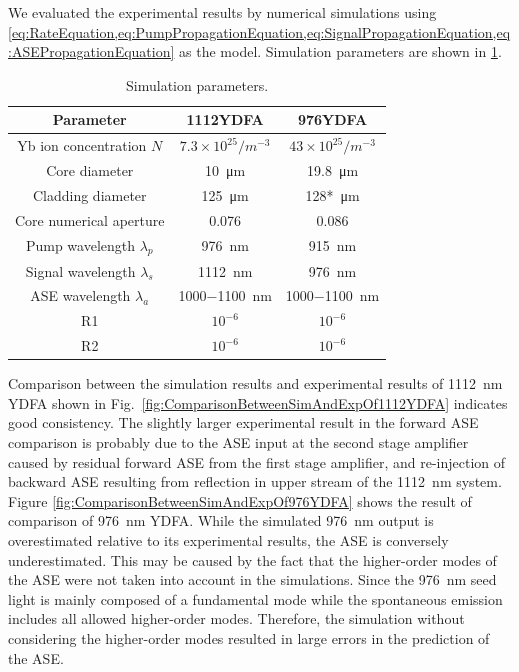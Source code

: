 \documentclass{osa-article}
\begin{document}
We evaluated the experimental results by numerical simulations using \cref{eq:RateEquation,eq:PumpPropagationEquation,eq:SignalPropagationEquation,eq:ASEPropagationEquation} as the model.
Simulation parameters are shown in \cref{tab:SimulationParameters}.
\begin{table}[htbp]
  \caption{Simulation parameters.}
  \label{tab:SimulationParameters}
  \centering
  \begin{tabular}{ccc}
    \hline
    Parameter & 1112YDFA & 976YDFA \\
    \hline \hline
    Yb ion concentration $N$ & $7.3 \times 10^{25}/\si{m^{-3}}$ & $43 \times 10^{25}/\si{m^{-3}}$ \\
    Core diameter & \SI{10}{\um} & \SI{19.8}{\um} \\
    Cladding diameter & \SI{125}{\um} & \SI{128*}{\um} \\
    Core numerical aperture & 0.076 & 0.086 \\
    Pump wavelength $\lambda_{p}$ & \SI{976}{\nm} & \SI{915}{\nm} \\
    Signal wavelength $\lambda_{s}$ & \SI{1112}{\nm} & \SI{976}{\nm} \\
    ASE wavelength $\lambda_{a}$ & \SI{1000-1100}{\nm} & \SI{1000-1100}{\nm} \\
    R1 & $10^{-6}$ & $10^{-6}$ \\
    R2 & $10^{-6}$ & $10^{-6}$ \\
  \end{tabular}
\end{table}
Comparison between the simulation results and experimental results of \SI{1112}{\nm} YDFA shown in Fig.~\ref{fig:ComparisonBetweenSimAndExpOf1112YDFA} indicates good consistency.
The slightly larger experimental result in the forward ASE comparison is probably due to the ASE input at the second stage amplifier caused by residual forward ASE from the first stage amplifier, and re-injection of backward ASE resulting from reflection in upper stream of the \SI{1112}{\nm} system.
Figure \cref{fig:ComparisonBetweenSimAndExpOf976YDFA} shows the result of comparison of \SI{976}{\nm} YDFA.
While the simulated \SI{976}{\nm} output is overestimated relative to its experimental results, the ASE is conversely underestimated.
This may be caused by the fact that the higher-order modes of the ASE were not taken into account in the simulations.
Since the \SI{976}{\nm} seed light is mainly composed of a fundamental mode while the spontaneous emission includes all allowed higher-order modes.
Therefore, the simulation without considering the higher-order modes resulted in large errors in the prediction of the ASE.
\end{document}
